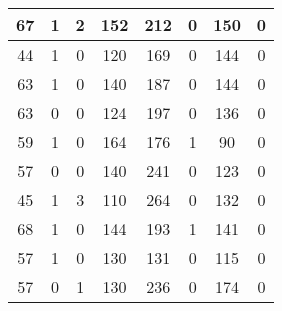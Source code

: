 \documentclass{article}
\begin{document}
\begin{longtable}{|c|c|c|c|c|c|c|c|}
67 & 1 & 2 & 152 & 212 & 0 & 150 & 0 \\ \hline
44 & 1 & 0 & 120 & 169 & 0 & 144 & 0 \\ \hline
63 & 1 & 0 & 140 & 187 & 0 & 144 & 0 \\ \hline
63 & 0 & 0 & 124 & 197 & 0 & 136 & 0 \\ \hline
59 & 1 & 0 & 164 & 176 & 1 & 90 & 0 \\ \hline
57 & 0 & 0 & 140 & 241 & 0 & 123 & 0 \\ \hline
45 & 1 & 3 & 110 & 264 & 0 & 132 & 0 \\ \hline
68 & 1 & 0 & 144 & 193 & 1 & 141 & 0 \\ \hline
57 & 1 & 0 & 130 & 131 & 0 & 115 & 0 \\ \hline
57 & 0 & 1 & 130 & 236 & 0 & 174 & 0 \\ \hline
\end{longtable}
\end{document}
